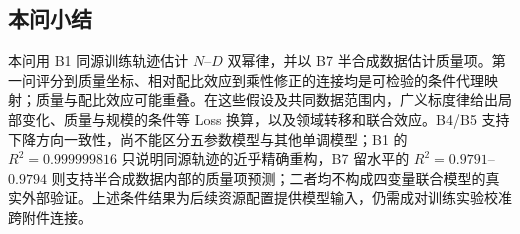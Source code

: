 \subsection{本问小结}

本问用 B1 同源训练轨迹估计 $N$--$D$ 双幂律，并以 B7 半合成数据估计质量项。第一问评分到质量坐标、相对配比效应到乘性修正的连接均是可检验的条件代理映射；质量与配比效应可能重叠。在这些假设及共同数据范围内，广义标度律给出局部变化、质量与规模的条件等 Loss 换算，以及领域转移和联合效应。B4/B5 支持下降方向一致性，尚不能区分五参数模型与其他单调模型；B1 的 $R^2=0.999999816$ 只说明同源轨迹的近乎精确重构，B7 留水平的 $R^2=0.9791$--$0.9794$ 则支持半合成数据内部的质量项预测；二者均不构成四变量联合模型的真实外部验证。上述条件结果为后续资源配置提供模型输入，仍需成对训练实验校准跨附件连接。
